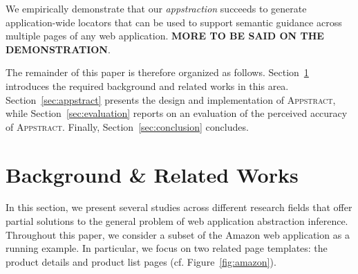 \documentclass[sigconf,authordraft]{acmart}
\theoremstyle{definition}
\begin{document}
We empirically demonstrate that our \emph{appstraction} succeeds to generate application-wide locators that can be used to support semantic guidance across multiple pages of any web application.
\textbf{MORE TO BE SAID ON THE DEMONSTRATION}.

The remainder of this paper is therefore organized as follows.
Section~\ref{sec:related} introduces the required background and related works in this area.
Section~\ref{sec:appstract} presents the design and implementation of \textsc{Appstract}, while Section~\ref{sec:evaluation} reports on an evaluation of the perceived accuracy of \textsc{Appstract}.
Finally, Section~\ref{sec:conclusion} concludes.

\section{Background \& Related Works}\label{sec:related}
In this section, we present several studies across different research fields that offer partial solutions to the general problem of web application abstraction inference. 
Throughout this paper, we consider a subset of the Amazon web application as a running example.
In particular, we focus on two related page templates: the product details and product list pages (cf. Figure~\ref{fig:amazon}).
\end{document}
